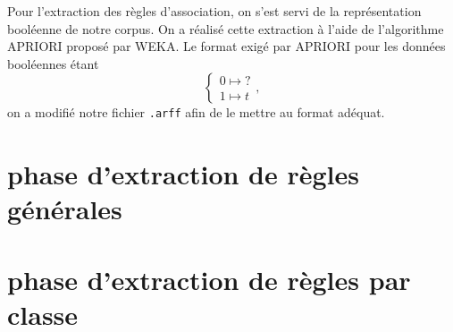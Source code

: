 
Pour l'extraction des règles d'association, on s'est servi de la représentation booléenne de notre corpus. On a réalisé cette extraction à l'aide de l'algorithme APRIORI proposé par WEKA. Le format exigé par APRIORI pour les données booléennes étant 
\begin{displaymath}
\begin{cases}
      0 \mapsto ? \\
      1 \mapsto t
\end{cases},
\end{displaymath} 
on a modifié notre fichier \texttt{.arff} afin de le mettre au format adéquat. 

\section{phase d'extraction de règles générales}

\section{phase d'extraction de règles par classe}
